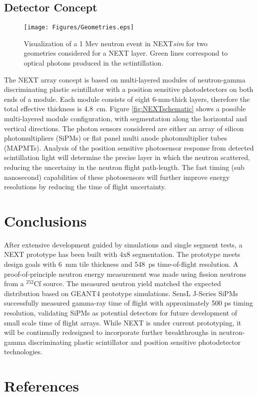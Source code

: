 \documentclass[preprint,3p,twocolumn]{elsarticle}
\begin{document}
\subsection{Detector Concept}
\begin{figure}[tp]
 \centering
  \texttt{[image: Figures/Geometries.eps]}
  \caption{Visualization of a 1 Mev neutron event in NEXT\emph{sim} for two geometries considered for a NEXT layer. Green lines correspond to optical photons produced in the sctintillation.}
  \label{fig:Geometries}
\end{figure} 


The NEXT array concept is based on multi-layered modules of neutron-gamma discriminating plastic scintillator with a position sensitive photodetectors on both ends of a module. Each module consists of eight 6-mm-thick layers, therefore the total effective thickness is 4.8~cm. Figure \ref{fig:NEXTschematic} shows a possible multi-layered module configuration, with segmentation along the horizontal and vertical directions. The photon sensors considered are either an array of silicon photomultipliers (SiPMs) or flat panel multi anode photomultiplier tubes (MAPMTs). Analysis of the position sensitive photosensor response from detected scintillation light will determine the precise layer in which the neutron scattered, reducing the uncertainy in the neutron flight path-length. The fast timing (sub nanosecond) capabilities of these photosensors will further improve energy resolutions by reducing the time of flight uncertainty. 





\section{Conclusions}
After extensive development guided by simulations and single segment tests, a NEXT prototype has been built with 4x8 segmentation. The prototype meets design goals with 6~mm tile thickness and 548~ps time-of-flight resolution. A proof-of-principle neutron energy measurement was made using fission neutrons from a $^{252}$Cf source. The measured neutron yield matched the expected distribution based on GEANT4 prototype simulations.
SensL\textsuperscript{\texttrademark} J-Series SiPMs successfully measured gamma-ray time of flight with approximately 500 ps timing resolution, validating SiPMs as potential detectors for future development of small scale time of flight arrays.
While NEXT is under current prototyping, it will be continually redesigned to incorporate further breakthroughs in neutron-gamma discriminating plastic scintillator and position sensitive photodetector technologies.

\section*{References}
%

\end{document}
